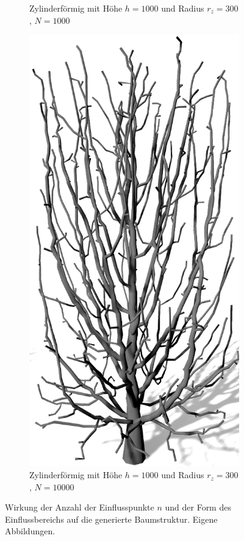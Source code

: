 \begin{figure} [hbtp]
\begin{subfigure}[t]{.45\textwidth}
		\caption{Zylinderförmig mit Höhe $h=1000$ und Radius $r_z = 300$, $N = 1000$}
		\label{subfig:SCA_Einfluss_Cylinder_Low}
	\end{subfigure}
	\hspace{.05\linewidth}
	\begin{subfigure}[t]{.45\textwidth}
		\centering
		\includegraphics[height=.21\textheight]{images/SCA_Einfluss_Cylinder_High.png}
		\caption{Zylinderförmig mit Höhe $h=1000$ und Radius $r_z = 300$, $N = 10000$}
		\label{subfig:SCA_Einfluss_Cylinder_High}
	\end{subfigure}
	\caption{Wirkung der Anzahl der Einflusspunkte $n$ und der Form des Einflussbereichs auf die generierte Baumstruktur. Eigene Abbildungen.}
	\label{fig:SCA_Einfluss}
\end{figure}
 
